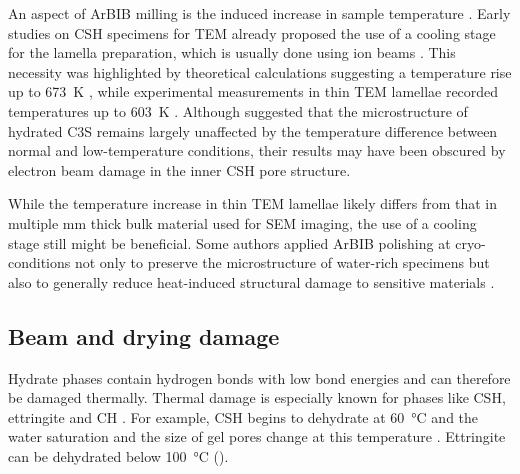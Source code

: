 An aspect of \ac{ArBIB} milling is the induced increase in sample temperature \cite{kim.2003}.
Early studies on \ac{CSH} specimens for \ac{TEM} already proposed the use of a cooling stage for the lamella preparation, which is usually done using ion beams \cite{groves.1986, richardson.1993}.
This necessity was highlighted by theoretical calculations suggesting a temperature rise up to \qty{673}{\kelvin} \cite{viguier.2001}, while experimental measurements in thin TEM lamellae recorded temperatures up to \qty{603}{\kelvin} \cite{park.2007}.
Although \textcite{groves.1986} suggested that the microstructure of hydrated \ac{C3S} remains largely unaffected by the temperature difference between normal and low-temperature conditions, their results may have been obscured by electron beam damage in the inner \ac{CSH} pore structure.

While the temperature increase in thin \ac{TEM} lamellae likely differs from that in multiple \unit{\milli\meter} thick bulk material used for \ac{SEM} imaging, the use of a cooling stage still might be beneficial.
Some authors applied \ac{ArBIB} polishing at cryo-conditions not only to preserve the microstructure of water-rich specimens but also to generally reduce heat-induced structural damage to sensitive materials \cite{desbois.2013, schmatz.2015, schmatz.2016a}.


\subsection{Beam and drying damage}
\label{sec:beam_damage} 

Hydrate phases contain hydrogen bonds with low bond energies and can therefore be damaged thermally.
Thermal damage is especially known for phases like \ac{CSH}, ettringite and \ac{CH} \cite{lothenbach.2016}.
For example, \ac{CSH} begins to dehydrate at \qty{60}{\celsius} \cite{he.2018} and the water saturation and the size of gel pores change at this temperature \cite{gajewicz.2016}.
Ettringite can be dehydrated below \qty{100}{\celsius} ().

